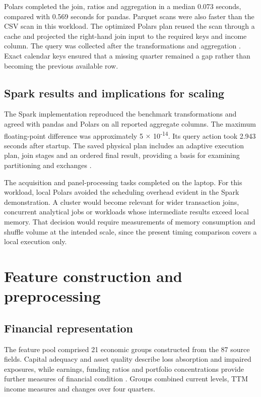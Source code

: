 \documentclass[11pt,a4paper]{article}
\begin{document}
Polars completed the join, ratios and aggregation in a median 0.073 seconds, compared with 0.569 seconds for pandas. Parquet scans were also faster than the CSV scan in this workload. The optimized Polars plan reused the scan through a cache and projected the right-hand join input to the required keys and income column. The query was collected after the transformations and aggregation \citep{polars}. Exact calendar keys ensured that a missing quarter remained a gap rather than becoming the previous available row.

\subsection{Spark results and implications for scaling}
The Spark implementation reproduced the benchmark transformations and agreed with pandas and Polars on all reported aggregate columns. The maximum floating-point difference was approximately 5 \(\times\) 10\textsuperscript{-14}. Its query action took 2.943 seconds after startup. The saved physical plan includes an adaptive execution plan, join stages and an ordered final result, providing a basis for examining partitioning and exchanges \citep{spark}.

The acquisition and panel-processing tasks completed on the laptop. For this workload, local Polars avoided the scheduling overhead evident in the Spark demonstration. A cluster would become relevant for wider transaction joins, concurrent analytical jobs or workloads whose intermediate results exceed local memory. That decision would require measurements of memory consumption and shuffle volume at the intended scale, since the present timing comparison covers a local execution only.

\section{Feature construction and preprocessing}
\subsection{Financial representation}
The feature pool comprised 21 economic groups constructed from the 87 source fields. Capital adequacy and asset quality describe loss absorption and impaired exposures, while earnings, funding ratios and portfolio concentrations provide further measures of financial condition \citep{petropoulos,failingbanks}. Groups combined current levels, TTM income measures and changes over four quarters.
\end{document}
